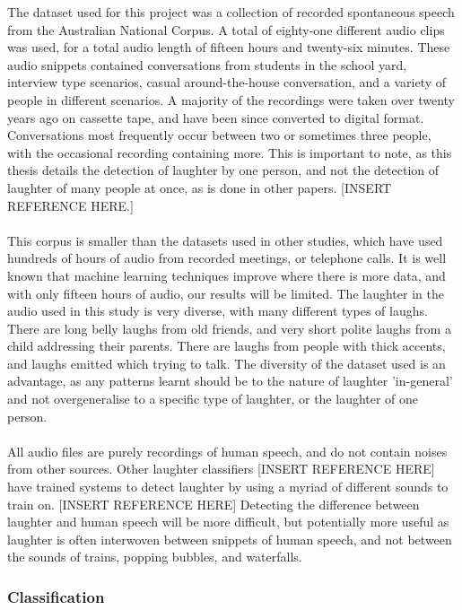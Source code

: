 \documentclass[a4paper,11pt,notitlepage]{article}
\begin{document}
The dataset used for this project was a collection of recorded spontaneous speech from the Australian National Corpus. A total of eighty-one different audio clips was used, for a total audio length of fifteen hours and twenty-six minutes. These audio snippets contained conversations from students in the school yard, interview type scenarios, casual around-the-house conversation, and a variety of people in different scenarios. A majority of the recordings were taken over twenty years ago on cassette tape, and have been since converted to digital format. Conversations most frequently occur between two or sometimes three people, with the occasional recording containing more. This is important to note, as this thesis details the detection of laughter by one person, and not the detection of laughter of many people at once, as is done in other papers. [INSERT REFERENCE HERE.]\\
\\
This corpus is smaller than the datasets used in other studies, which have used hundreds of hours of audio from recorded meetings, or telephone calls. It is well known that machine learning techniques improve where there is more data, and with only fifteen hours of audio, our results will be limited. The laughter in the audio used in this study is very diverse, with many different types of laughs. There are long belly laughs from old friends, and very short polite laughs from a child addressing their parents. There are laughs from people with thick accents, and laughs emitted which trying to talk. The diversity of the dataset used is an advantage, as any patterns learnt should be to the nature of laughter 'in-general' and not overgeneralise to a specific type of laughter, or the laughter of one person.\\
\\
All audio files are purely recordings of human speech, and do not contain noises from other sources. Other laughter classifiers [INSERT REFERENCE HERE] have trained systems to detect laughter by using a myriad of different sounds to train on. [INSERT REFERENCE HERE] Detecting the difference between laughter and human speech will be more difficult, but potentially more useful as laughter is often interwoven between snippets of human speech, and not between the sounds of trains, popping bubbles, and waterfalls.

\subsubsection{Classification}
\end{document}
